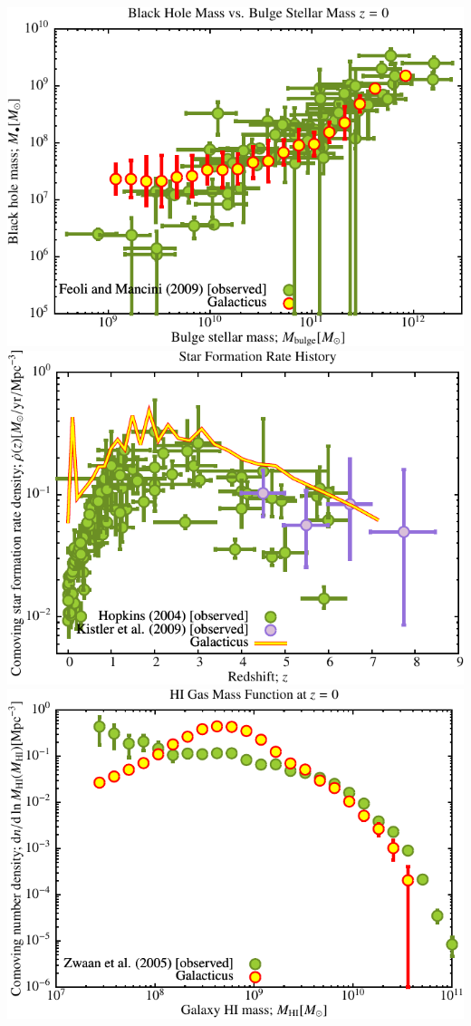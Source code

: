 \includegraphics[scale=0.6]{r256/h100/red_st14_log2/Plot_Black_Hole_vs_Bulge_Mass.pdf}
\includegraphics[scale=0.6]{r256/h100/red_st14_log2/Plot_Star_Formation_History.pdf} \\
\includegraphics[scale=0.6]{r256/h100/red_st14_log2/Plot_HI_Mass_Function.pdf}
% 
%
%
%
%
%
%
%

